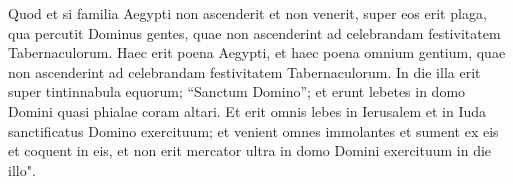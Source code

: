 \begin{biblechapter}
\verse Quod et si familia Aegypti non ascenderit et non venerit, super eos erit plaga, qua percutit Dominus gentes, quae non ascenderint ad celebrandam festivitatem Tabernaculorum. 
\verse Haec erit poena Aegypti, et haec poena omnium gentium, quae non ascenderint ad celebrandam festivitatem Tabernaculorum. 
\verse In die illa erit super tintinnabula equorum; “Sanctum Domino”; et erunt lebetes in domo Domini quasi phialae coram altari. 
\verse Et erit omnis lebes in Ierusalem et in Iuda sanctificatus Domino exercituum; et venient omnes immolantes et sument ex eis et coquent in eis, et non erit mercator ultra in domo Domini exercituum in die illo".    
\end{biblechapter}
